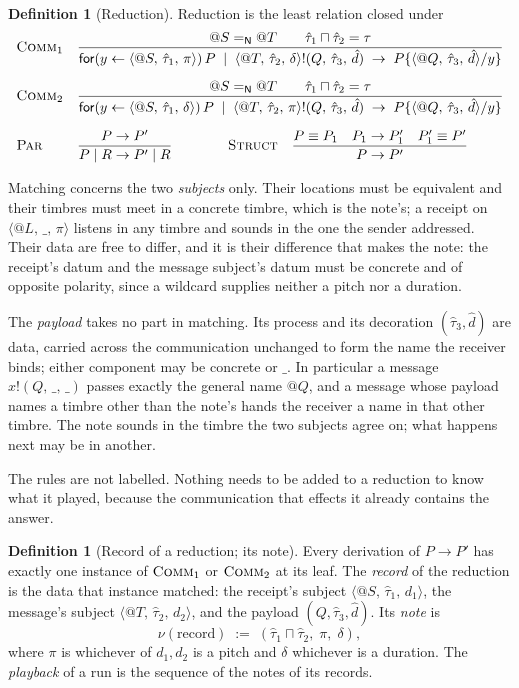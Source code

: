 \documentclass[11pt,a4paper]{article}
\makeatletter
\theoremstyle{plain}
\theoremstyle{definition}
\newtheorem{definition}[theorem]{Definition}
\theoremstyle{remark}
\let\oldsc\textsc
\renewcommand{\textsc}[1]{\textup{\oldsc{#1}}}
\newcommand{\scong}{\equiv}
\newcommand{\nameq}{=_{\mathsf{N}}}
\newcommand{\nm}[3]{\langle @#1,\,#2,\,#3\rangle}
\newcommand{\snd}[4]{#1!(#2,\,#3,\,#4)}
\newcommand{\rcv}[3]{\mathsf{for}(#1 \leftarrow #2)\,#3}
\newcommand{\wild}{\_}
\newcommand{\meet}{\sqcap}
\makeatother
\begin{document}
\begin{definition}[Reduction]\label{def:red}
Reduction is the least relation closed under
\[
\begin{array}{ll}
\textsc{Comm}_1 &
\dfrac{@S \nameq @T \qquad \hat\tau_1 \meet \hat\tau_2 = \tau}
{\rcv{y}{\nm{S}{\hat\tau_1}{\pi}}{P} \;\mid\; \snd{\nm{T}{\hat\tau_2}{\delta}}{Q}{\hat\tau_3}{\hat d}
 \;\to\; P\{\nm{Q}{\hat\tau_3}{\hat d}/y\}}
\\[18pt]
\textsc{Comm}_2 &
\dfrac{@S \nameq @T \qquad \hat\tau_1 \meet \hat\tau_2 = \tau}
{\rcv{y}{\nm{S}{\hat\tau_1}{\delta}}{P} \;\mid\; \snd{\nm{T}{\hat\tau_2}{\pi}}{Q}{\hat\tau_3}{\hat d}
 \;\to\; P\{\nm{Q}{\hat\tau_3}{\hat d}/y\}}
\\[18pt]
\textsc{Par} &
\dfrac{P \to P'}{P \mid R \to P' \mid R}
\qquad\qquad
\textsc{Struct}\quad
\dfrac{P \scong P_1 \quad P_1 \to P_1' \quad P_1' \scong P'}{P \to P'}
\end{array}
\]
\end{definition}

Matching concerns the two \emph{subjects} only. Their locations must be
equivalent and their timbres must meet in a concrete timbre, which is the note's;
a receipt on $\nm{L}{\wild}{\pi}$ listens in any timbre and sounds in the one the
sender addressed. Their data are free to differ, and it is their difference
that makes the note: the receipt's datum and the message subject's datum must be
concrete and of opposite polarity, since a wildcard supplies neither a pitch nor
a duration.

The \emph{payload} takes no part in matching. Its process and its decoration
$(\hat\tau_3, \hat d)$ are data, carried across the communication unchanged to
form the name the receiver binds; either component may be concrete or $\wild$.
In particular a message $\snd{x}{Q}{\wild}{\wild}$ passes exactly the general
name $@Q$, and a message whose payload names a timbre other than the note's
hands the receiver a name in that other timbre. The note sounds in the timbre
the two subjects agree on; what happens next may be in another.

The rules are not labelled. Nothing needs to be added to a reduction to know
what it played, because the communication that effects it already contains the
answer.

\begin{definition}[Record of a reduction; its note]\label{def:record}
Every derivation of $P \to P'$ has exactly one instance of $\textsc{Comm}_1$ or
$\textsc{Comm}_2$ at its leaf. The \emph{record} of the reduction is the data
that instance matched: the receipt's subject $\nm{S}{\hat\tau_1}{d_1}$, the
message's subject $\nm{T}{\hat\tau_2}{d_2}$, and the payload
$(Q,\hat\tau_3,\hat d)$. Its \emph{note} is
\[
\nu(\text{record}) \;:=\; (\hat\tau_1 \meet \hat\tau_2,\; \pi,\; \delta),
\]
where $\pi$ is whichever of $d_1, d_2$ is a pitch and $\delta$ whichever is a
duration. The \emph{playback} of a run is the sequence of the notes of its
records.
\end{definition}
\end{document}
